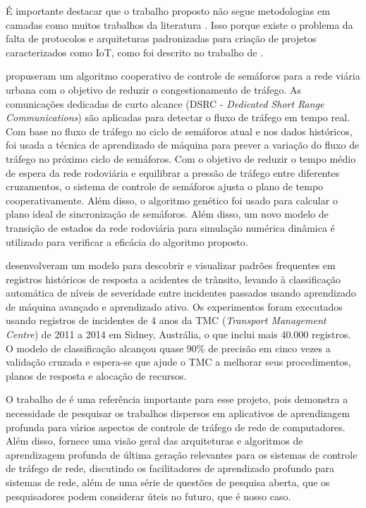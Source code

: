 \documentclass[12pt,cor2018]{uftpibic}
\begin{document}
É importante destacar que o trabalho proposto não segue metodologias em camadas como muitos trabalhos da literatura \cite{Moore, Chen}. Isso porque existe o problema da falta de protocolos e arquiteturas padronizadas para criação de projetos caracterizados como IoT, como foi descrito no trabalho de .

 propuseram um algoritmo cooperativo de controle de semáforos para a rede viária urbana com o objetivo de reduzir o congestionamento de tráfego. As comunicações dedicadas de curto alcance (DSRC - {\it Dedicated Short Range Communications}) são aplicadas para detectar o fluxo de tráfego em tempo real. Com base no fluxo de tráfego no ciclo de semáforos atual e nos dados históricos, foi usada a técnica de aprendizado de máquina para prever a variação do fluxo de tráfego no próximo ciclo de semáforos. Com o objetivo de reduzir o tempo médio de espera da rede rodoviária e equilibrar a pressão de tráfego entre diferentes cruzamentos, o sistema de controle de semáforos ajusta o plano de tempo cooperativamente. Além disso, o algoritmo genético foi usado para calcular o plano ideal de sincronização de semáforos. Além disso, um novo modelo de transição de estados da rede rodoviária para simulação numérica dinâmica é utilizado para verificar a eficácia do algoritmo proposto.

 desenvolveram um modelo para descobrir e visualizar padrões frequentes em registros históricos de resposta a acidentes de trânsito, levando à classificação automática de níveis de severidade entre incidentes passados usando aprendizado de máquina avançado e aprendizado ativo. Os experimentos foram executados usando registros de incidentes de 4 anos da TMC ({\it Transport Management Centre}) de 2011 a 2014 em Sidney, Austrália, o que inclui mais 40.000 registros. O modelo de classificação alcançou quase 90\% de precisão em cinco vezes a validação cruzada e espera-se que ajude o TMC a melhorar seus procedimentos, planos de resposta e alocação de recursos.

O trabalho de  é uma referência importante para esse projeto, pois demonstra a necessidade de pesquisar os trabalhos dispersos em aplicativos de aprendizagem profunda para vários aspectos de controle de tráfego de rede de computadores. Além disso, fornece uma visão geral das arquiteturas e algoritmos de aprendizagem profunda de última geração relevantes para os sistemas de controle de tráfego de rede, discutindo os facilitadores de aprendizado profundo para sistemas de rede, além de uma série de questões de pesquisa aberta, que os pesquisadores podem considerar úteis no futuro, que é nosso caso.
\end{document}
